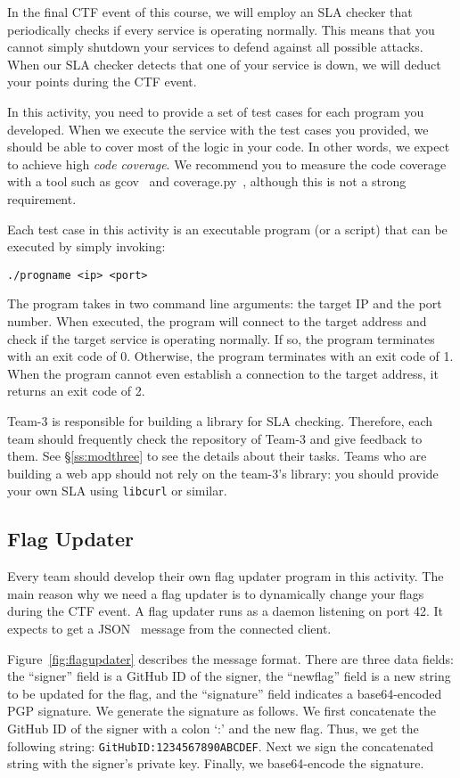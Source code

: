 \documentclass[a4paper, 11pt]{article}
\theoremstyle{definition}
\begin{document}
{In the final CTF event of this course, we will employ an SLA checker
that periodically checks if every service is operating normally. This
means that you cannot simply shutdown your services to defend against
all possible attacks. When our SLA checker detects that one of your
service is down, we will deduct your points during the CTF event.

In this activity, you need to provide a set of test cases for each
program you developed. When we execute the service with the test cases
you provided, we should be able to cover most of the logic in your
code. In other words, we expect to achieve high \emph{code coverage}.
We recommend you to measure the code coverage with a tool such as
gcov~\cite{gcov} and coverage.py~\cite{pycov}, although this is not a
strong requirement.

Each test case in this activity is an executable program (or a script)
that can be executed by simply invoking:
\begin{verbatim}
./progname <ip> <port>
\end{verbatim}
The program takes in two command line arguments: the target IP and the
port number. When executed, the program will connect to the target
address and check if the target service is operating normally. If so,
the program terminates with an exit code of 0. Otherwise, the program
terminates with an exit code of 1. When the program cannot even
establish a connection to the target address, it returns an exit code
of 2.

Team-3 is responsible for building a library for SLA checking.
Therefore, each team should frequently check the repository of Team-3
and give feedback to them. See \S\ref{ss:modthree} to see the details
about their tasks. Teams who are building a web app should not rely on
the team-3's library: you should provide your own SLA using
\texttt{libcurl} or similar.

\subsection{Flag Updater} \label{ss:flagupdater}

Every team should develop their own flag updater program in this
activity. The main reason why we need a flag updater is to dynamically
change your flags during the CTF event. A flag updater runs as a
daemon listening on port 42. It expects to get a JSON~\cite{json}
message from the connected client.

Figure~\ref{fig:flagupdater} describes the message format. There are
three data fields: the ``signer'' field is a GitHub ID of the signer,
the ``newflag'' field is a new string to be updated for the flag, and
the ``signature'' field indicates a base64-encoded PGP signature. We
generate the signature as follows. We first concatenate the GitHub ID
of the signer with a colon `:' and the new flag. Thus, we get the
following string: \texttt{GitHubID:1234567890ABCDEF}. Next we sign the
concatenated string with the signer's private key. Finally, we
base64-encode the signature.

}
\end{document}
